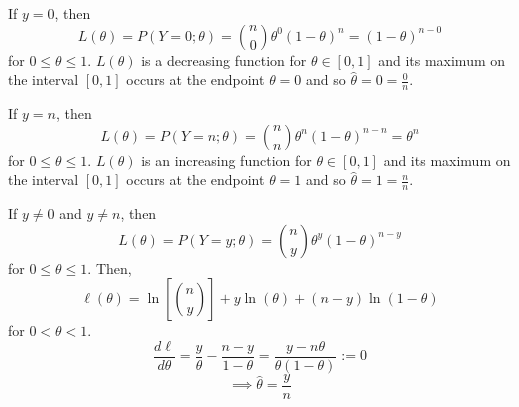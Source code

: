 \begin{Proof}{}{}
If $ y=0 $, then
\[ L(\theta)=P(Y=0;\theta)=\binom{n}{0}\theta^0(1-\theta)^n=(1-\theta)^{n-0} \]
for $ 0\leqslant \theta \leqslant 1 $. $ L(\theta) $ is a decreasing function
for $ \theta\in[0,1] $ and its maximum on the interval $ [0,1] $
occurs at the endpoint $ \theta=0 $ and so $ \hat{\theta}=0=\frac{0}{n} $.

If $ y=n $, then
\[ L(\theta)=P(Y=n;\theta)=\binom{n}{n}\theta^n(1-\theta)^{n-n}=\theta^n \]
for $ 0\leqslant \theta \leqslant 1 $. $ L(\theta) $ is an increasing function
for $ \theta\in[0,1] $ and its maximum on the interval $ [0,1] $
occurs at the endpoint $ \theta=1 $ and so $ \hat{\theta}=1=\frac{n}{n} $.

If $ y\neq 0 $ and $ y\neq n $, then
\[ L(\theta)=P(Y=y;\theta)=\binom{n}{y}\theta^y(1-\theta)^{n-y} \]
for $ 0\leqslant \theta\leqslant 1 $. Then,
\[ \ell(\theta)=\ln\left[ \binom{n}{y} \right]+y\ln(\theta)+(n-y)\ln(1-\theta) \]
for $ 0<\theta<1 $.
\[ \frac{d\ell}{d\theta}=\frac{y}{\theta}-\frac{n-y}{1-\theta}=\frac{y-n\theta}{\theta(1-\theta)}:=0  \]
\[ \implies \hat{\theta}=\frac{y}{n} \]
\end{Proof}

